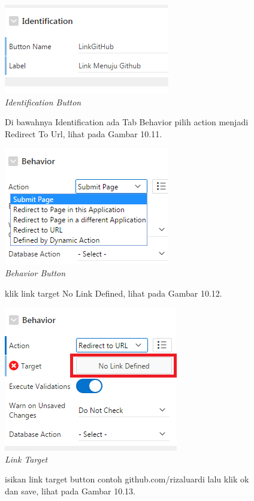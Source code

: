 \begin{enumerate}
\begin{figure}
        \centering
        \includegraphics[scale=0.7]{figures/bab10/9.png}
        \caption{\textit{Identification Button}}
        \label{Identification Button}
    \end{figure}
    \begin{figure}
	\item Di bawahnya Identification ada Tab Behavior pilih action menjadi Redirect To Url, lihat pada Gambar 10.11.
	
        \centering
        \includegraphics[scale=0.7]{figures/bab10/10.png}
        \caption{\textit{Behavior Button}}
        \label{Behavior Button}
    \end{figure}
    \begin{figure}
	\item klik link target No Link Defined, lihat pada Gambar 10.12.
	
        \centering
        \includegraphics[scale=0.7]{figures/bab10/11.png}
        \caption{\textit{Link Target}}
        \label{Link Target}
    \end{figure}
	\begin{figure}
	\item isikan link target button contoh github.com/rizaluardi lalu klik ok dan save, lihat pada Gambar 10.13.
	

\end{figure}
\end{enumerate}
